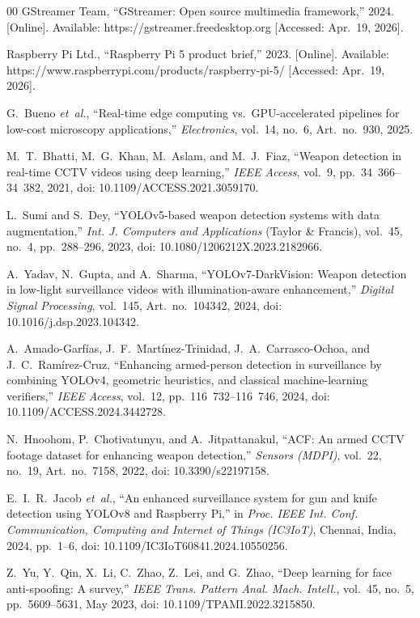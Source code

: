 \documentclass{ieeeaccess}
\begin{document}
\begin{thebibliography}{00}
 GStreamer Team, ``GStreamer: Open source multimedia framework,'' 2024. [Online]. Available: https://gstreamer.freedesktop.org [Accessed: Apr.~19, 2026].

 Raspberry Pi Ltd., ``Raspberry Pi 5 product brief,'' 2023. [Online]. Available: https://www.raspberrypi.com/products/raspberry-pi-5/ [Accessed: Apr.~19, 2026].

 G.~Bueno \emph{et~al.}, ``Real-time edge computing vs.\ GPU-accelerated pipelines for low-cost microscopy applications,'' \emph{Electronics}, vol.~14, no.~6, Art.~no.~930, 2025.

 M.~T.~Bhatti, M.~G.~Khan, M.~Aslam, and M.~J.~Fiaz, ``Weapon detection in real-time CCTV videos using deep learning,'' \emph{IEEE Access}, vol.~9, pp.~34~366--34~382, 2021, doi: 10.1109/ACCESS.2021.3059170.

 L.~Sumi and S.~Dey, ``YOLOv5-based weapon detection systems with data augmentation,'' \emph{Int. J. Computers and Applications} (Taylor \& Francis), vol.~45, no.~4, pp.~288--296, 2023, doi: 10.1080/1206212X.2023.2182966.

 A.~Yadav, N.~Gupta, and A.~Sharma, ``YOLOv7-DarkVision: Weapon detection in low-light surveillance videos with illumination-aware enhancement,'' \emph{Digital Signal Processing}, vol.~145, Art.~no.~104342, 2024, doi: 10.1016/j.dsp.2023.104342.

 A.~Amado-Garf\'{i}as, J.~F.~Mart\'{i}nez-Trinidad, J.~A.~Carrasco-Ochoa, and J.~C.~Ram\'{i}rez-Cruz, ``Enhancing armed-person detection in surveillance by combining YOLOv4, geometric heuristics, and classical machine-learning verifiers,'' \emph{IEEE Access}, vol.~12, pp.~116~732--116~746, 2024, doi: 10.1109/ACCESS.2024.3442728.

 N.~Hnoohom, P.~Chotivatunyu, and A.~Jitpattanakul, ``ACF: An armed CCTV footage dataset for enhancing weapon detection,'' \emph{Sensors (MDPI)}, vol.~22, no.~19, Art.~no.~7158, 2022, doi: 10.3390/s22197158.

 E.~I.~R.~Jacob \emph{et~al.}, ``An enhanced surveillance system for gun and knife detection using YOLOv8 and Raspberry Pi,'' in \emph{Proc. IEEE Int. Conf. Communication, Computing and Internet of Things (IC3IoT)}, Chennai, India, 2024, pp.~1--6, doi: 10.1109/IC3IoT60841.2024.10550256.

 Z.~Yu, Y.~Qin, X.~Li, C.~Zhao, Z.~Lei, and G.~Zhao, ``Deep learning for face anti-spoofing: A survey,'' \emph{IEEE Trans. Pattern Anal. Mach. Intell.}, vol.~45, no.~5, pp.~5609--5631, May 2023, doi: 10.1109/TPAMI.2022.3215850.


\end{thebibliography}
\end{document}
